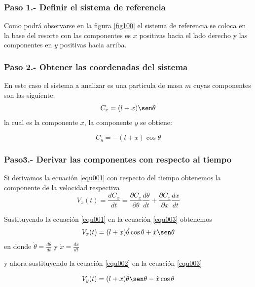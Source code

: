\documentclass[12pt]{book}
\theoremstyle{definition}
\theoremstyle{remark}
\theoremstyle{plain}
\begin{document}
\subsubsection{Paso 1.- Definir el sistema de referencia}

Como podrá observarse en la figura \ref{fig100} el sistema de referencia se coloca en la base del resorte con las componentes es $x$ positivas hacia el lado derecho y las componentes en $y$ positivas hacia arriba.

\subsubsection{Paso 2.- Obtener las coordenadas del sistema }
En este caso el sistema a analizar es una particula de masa $m$  cuyas componentes son las siguiente:
\begin{equation}
\label{equ001}
C_x = (l+x) \sen \theta
\end{equation}
la cual es la componente $x$, la componente $y$ se obtiene:

\begin{equation}
\label{equ002}
C_y = - (l+x) \cos \theta
\end{equation}

\subsubsection{Paso3.-  Derivar las componentes con respecto al tiempo}

Si derivamos la ecuación \ref{equ001} con respecto del tiempo obtenemos la componente de la velocidad respectiva
\begin{equation}
\label{equ003}
V_x (t)= \frac{d C_x}{d t} = \frac{\partial C_x}{\partial \theta} \frac{d \theta}{d t}+ \frac{\partial C_x}{\partial x} \frac{d x}{d t}
\end{equation}

Sustituyendo la ecuación \ref{equ001}  en la ecuación \ref{equ003} obtenemos
\begin{equation}
\label{equ004}
V_x (t)= (l+x) \dot{\theta} \cos \theta+ \dot{x} \sen \theta 
\end{equation}  
en donde $\dot{\theta}=\frac{d \theta}{d t}$ y $\dot{x}=\frac{d x}{d t}$

y ahora sustituyendo  la ecuación \ref{equ002}  en la ecuación \ref{equ003} 

\begin{equation}
\label{equ005}
V_y (t)= (l+x) \dot{\theta} \sen \theta-  \dot{x} \cos \theta 
\end{equation}  
\end{document}

